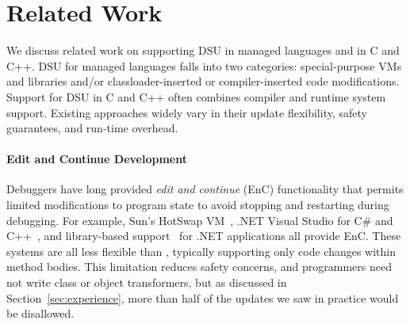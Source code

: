 \section{Related Work}

We discuss related work on supporting DSU in managed
languages and in C and C++. DSU for managed
languages falls into two categories: special-purpose VMs and libraries
and/or classloader-inserted or compiler-inserted code modifications.
Support for DSU in C and C++ often combines compiler and runtime
system support.  Existing approaches widely vary in their update
flexibility, safety guarantees, and run-time overhead.


\paragraph{Edit and Continue Development}

Debuggers have long provided \emph{edit and continue} (EnC)
functionality that permits
limited modifications to program state to avoid stopping and
restarting during debugging. For example, Sun's HotSwap
VM~\cite{JVMhotswap,Dmit01a}, .NET Visual Studio for C\# and
C++~\cite{VSEnC}, and library-based support~\cite{eaddy05enc} for .NET
applications all provide EnC.  These systems are all less flexible than
\DSU, typically supporting only code changes within method bodies.
This limitation reduces safety concerns, and programmers need not write
class or object transformers, but as discussed in
Section~\ref{sec:experience}, more than half of the updates we saw in
practice would be disallowed. 




